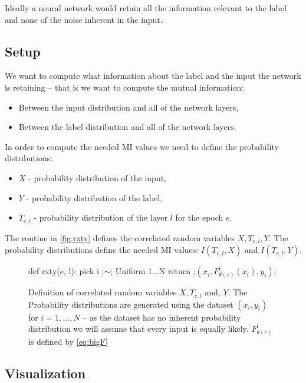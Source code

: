 \documentclass[dissertation.tex]{subfiles}
\begin{document}
Ideally a neural network would retain all the information relevant to the label
and none of the noise inherent in the input.

\subsection{Setup}

We want to compute what information about the label and the input the network is
retaining -- that is we want to compute the mutual information:
\begin{itemize}
  \item{
      Between the input distribution and all of the network layers,
    }
  \item{
      Between the label distribution and all of the network layers.
    }
\end{itemize}

In order to compute the needed MI values we need to define the probability
distributions:
\begin{itemize}
  \item{
      $X$ - probability distribution of the input,
    }
  \item{
      $Y$ - probability distribution of the label,
    }
  \item{
      $T_{e,l}$ - probability distribution of the layer $l$ for the epoch $e$.
    }
\end{itemize}

The routine in \autoref{fig:rxty} defines the correlated random variables
$X,T_{e,l},Y$. The probability distributions define the needed MI values:
$I(T_{e,l}, X)$ and $I(T_{e,l}, Y)$.

\begin{figure}[H]
    \begin{pythonfigure}
      def rxty(e, l):
        pick i ;$\sim$; Uniform {1...N}
        return ;$(x_i, F_{\theta(e)}^l(x_i), y_i)$;
    \end{pythonfigure}
    \caption{
      Definition of correlated random variables $X, T_{e,l}$ and, $Y$. The
      Probability distributions are generated using the dataset $(x_i, y_i)$ for
      $i = 1,...,N$ -- as the dataset has no inherent probability distribution
      we will assume that every input is equally likely. $F_{\theta(e)}^l$ is
      defined by \autoref{eq:bigF}
    }
    \label{fig:rxty}
\end{figure}

\subsection{Visualization}
\end{document}
